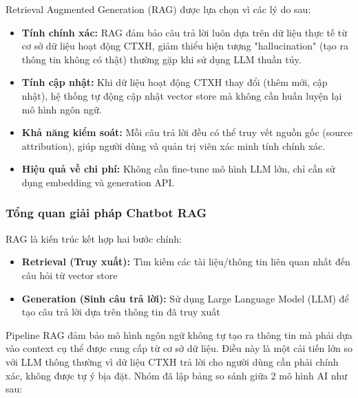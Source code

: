 Retrieval Augmented Generation (RAG) được lựa chọn vì các lý do sau:
\begin{itemize}
    \item \textbf{Tính chính xác:} RAG đảm bảo câu trả lời luôn dựa trên dữ liệu thực tế từ cơ sở dữ liệu hoạt động CTXH, giảm thiểu hiện tượng "hallucination" (tạo ra thông tin không có thật) thường gặp khi sử dụng LLM thuần túy.
    \item \textbf{Tính cập nhật:} Khi dữ liệu hoạt động CTXH thay đổi (thêm mới, cập nhật), hệ thống tự động cập nhật vector store mà không cần huấn luyện lại mô hình ngôn ngữ.

    \item \textbf{Khả năng kiểm soát:} Mỗi câu trả lời đều có thể truy vết nguồn gốc (source attribution), giúp người dùng và quản trị viên xác minh tính chính xác.
    \item \textbf{Hiệu quả về chi phí:} Không cần fine-tune mô hình LLM lớn, chỉ cần sử dụng embedding và generation API.
\end{itemize}

\subsubsection{Tổng quan giải pháp Chatbot RAG}

RAG là kiến trúc kết hợp hai bước chính:
\begin{itemize}
    \item \textbf{Retrieval (Truy xuất):} Tìm kiếm các tài liệu/thông tin liên quan nhất đến câu hỏi từ vector store
    \item \textbf{Generation (Sinh câu trả lời):} Sử dụng Large Language Model (LLM) để tạo câu trả lời dựa trên thông tin đã truy xuất
\end{itemize}

Pipeline RAG đảm bảo mô hình ngôn ngữ không tự tạo ra thông tin mà phải dựa vào context cụ thể được cung cấp từ cơ sở dữ liệu. Điều này là một cải tiến lớn so với LLM thông thường vì dữ liệu CTXH trả lời cho người dùng cần phải chính xác, không được tự ý bịa đặt. Nhóm đã lập bảng so sánh giữa 2 mô hình AI như sau:


